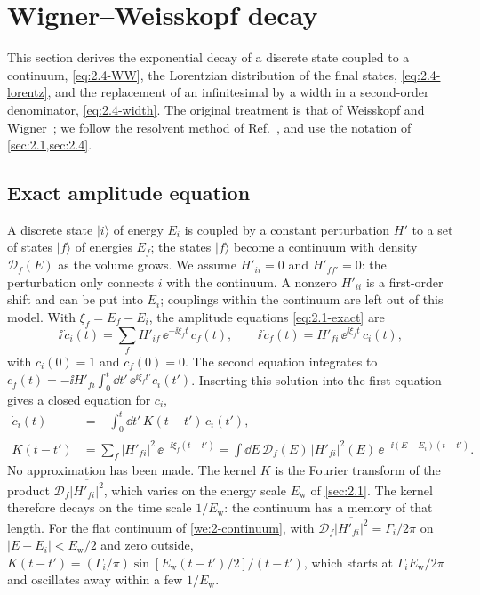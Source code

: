 \section{Wigner--Weisskopf decay}\label{app:D.3}

This section derives the exponential decay of a discrete state coupled to a continuum, \cref{eq:2.4-WW}, the Lorentzian distribution of the final states, \cref{eq:2.4-lorentz}, and the replacement of an infinitesimal by a width in a second-order denominator, \cref{eq:2.4-width}. The original treatment is that of Weisskopf and Wigner~\cite{weisskopf1930berechnung}; we follow the resolvent method of Ref.~\cite[Chap.~III]{cohentannoudji1998atom}, and use the notation of \cref{sec:2.1,sec:2.4}.

\subsection*{Exact amplitude equation}

A discrete state $|i\rangle$ of energy $E_i$ is coupled by a constant perturbation $H'$ to a set of states $|f\rangle$ of energies $E_f$; the states $|f\rangle$ become a continuum with density $\mathcal{D}_f(E)$ as the volume grows. We assume $H'_{ii} = 0$ and $H'_{ff'} = 0$: the perturbation only connects $i$ with the continuum. A nonzero $H'_{ii}$ is a first-order shift and can be put into $E_i$; couplings within the continuum are left out of this model. With $\xi_f = E_f - E_i$, the amplitude equations \cref{eq:2.1-exact} are
\begin{equation}
  \ii\,\dot c_i(t) = \sum_f H'_{if}\,\ee^{-\ii\xi_ft}\,c_f(t), \qquad
  \ii\,\dot c_f(t) = H'_{fi}\,\ee^{\ii\xi_ft}\,c_i(t),
  \label{eq:D.3-amp}
\end{equation}
with $c_i(0) = 1$ and $c_f(0) = 0$. The second equation integrates to $c_f(t) = -\ii H'_{fi}\int_0^t\dd t'\,\ee^{\ii\xi_ft'}c_i(t')$. Inserting this solution into the first equation gives a closed equation for $c_i$,
\begin{equation}
  \begin{aligned}
  \dot c_i(t) &= -\int_0^t\dd t'\,K(t - t')\,c_i(t'), \\
  K(t - t') &= \sum_f|H'_{fi}|^2\,\ee^{-\ii\xi_f(t - t')} = \int\dd E\,\mathcal{D}_f(E)\,\overline{|H'_{fi}|^2}(E)\,\ee^{-\ii(E - E_i)(t - t')} .
  \end{aligned}
  \label{eq:D.3-kernel}
\end{equation}
No approximation has been made. The kernel $K$ is the Fourier transform of the product $\mathcal{D}_f\overline{|H'_{fi}|^2}$, which varies on the energy scale $E_{\mathrm{w}}$ of \cref{sec:2.1}. The kernel therefore decays on the time scale $1/E_{\mathrm{w}}$: the continuum has a memory of that length. For the flat continuum of \cref{we:2-continuum}, with $\mathcal{D}_f\overline{|H'_{fi}|^2} = \varGamma_i/2\pi$ on $|E - E_i| < E_{\mathrm{w}}/2$ and zero outside, $K(t - t') = (\varGamma_i/\pi)\sin[E_{\mathrm{w}}(t - t')/2]/(t - t')$, which starts at $\varGamma_iE_{\mathrm{w}}/2\pi$ and oscillates away within a few $1/E_{\mathrm{w}}$.

